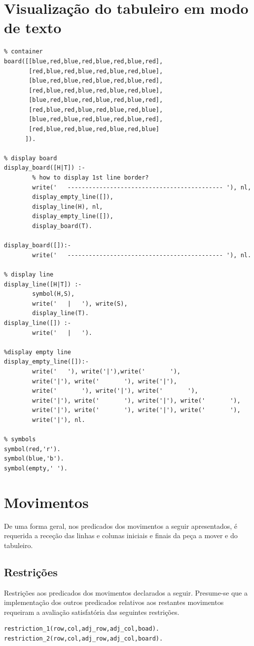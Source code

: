 \documentclass[a4paper,11pt,titlepage]{article}
\begin{document}
\section{Visualização do tabuleiro em modo de texto}

\begin{verbatim}
% container
board([[blue,red,blue,red,blue,red,blue,red],
       [red,blue,red,blue,red,blue,red,blue],
       [blue,red,blue,red,blue,red,blue,red],
       [red,blue,red,blue,red,blue,red,blue],
       [blue,red,blue,red,blue,red,blue,red],
       [red,blue,red,blue,red,blue,red,blue],
       [blue,red,blue,red,blue,red,blue,red],
       [red,blue,red,blue,red,blue,red,blue]
      ]).

% display board
display_board([H|T]) :- 
        % how to display 1st line border?
        write('   -------------------------------------------- '), nl,
        display_empty_line([]),
        display_line(H), nl,
        display_empty_line([]),
        display_board(T).

display_board([]):-
        write('   -------------------------------------------- '), nl.

% display line
display_line([H|T]) :-
        symbol(H,S),
        write('   |   '), write(S), 
        display_line(T).
display_line([]) :-
        write('   |   ').

%display empty line
display_empty_line([]):-
        write('   '), write('|'),write('       '),
        write('|'), write('       '), write('|'),
        write('       '), write('|'), write('       '),
        write('|'), write('       '), write('|'), write('       '),
        write('|'), write('       '), write('|'), write('       '),
        write('|'), nl.

% symbols
symbol(red,'r').
symbol(blue,'b').
symbol(empty,' ').
\end{verbatim}

\section{Movimentos}

De uma forma geral, nos predicados dos movimentos a seguir apresentados, é requerida a receção das linhas e colunas iniciais e finais da peça a mover e do tabuleiro.
\subsection{Restrições}
Restrições aos predicados dos movimentos declarados a seguir. Presume-se que a implementação dos outros predicados relativos aos restantes movimentos requeiram a avaliação satisfatória das seguintes restrições.
\begin{verbatim}
restriction_1(row,col,adj_row,adj_col,boad).
restriction_2(row,col,adj_row,adj_col,board).
\end{verbatim}
\end{document}
